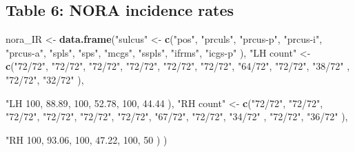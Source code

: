\documentclass[
]{article}
\newenvironment{Shaded}{\begin{snugshade}}{\end{snugshade}}
\newcommand{\DecValTok}[1]{\textcolor[rgb]{0.00,0.00,0.81}{#1}}
\newcommand{\FloatTok}[1]{\textcolor[rgb]{0.00,0.00,0.81}{#1}}
\newcommand{\KeywordTok}[1]{\textcolor[rgb]{0.13,0.29,0.53}{\textbf{#1}}}
\newcommand{\NormalTok}[1]{#1}
\newcommand{\StringTok}[1]{\textcolor[rgb]{0.31,0.60,0.02}{#1}}
\begin{document}
\hypertarget{table-6-nora-incidence-rates}{%
\subsection{Table 6: NORA incidence
rates}\label{table-6-nora-incidence-rates}}

\begin{Shaded}
\begin{Highlighting}[]
\NormalTok{nora_IR <-}\StringTok{ }\KeywordTok{data.frame}\NormalTok{(}\StringTok{"sulcus"}\NormalTok{ <-}\StringTok{ }\KeywordTok{c}\NormalTok{(}\StringTok{"pos"}\NormalTok{, }\StringTok{"prculs"}\NormalTok{, }\StringTok{"prcus-p"}\NormalTok{, }\StringTok{"prcus-i"}\NormalTok{, }\StringTok{"prcus-a"}\NormalTok{, }
                                         \StringTok{"spls"}\NormalTok{, }\StringTok{"sps"}\NormalTok{, }\StringTok{"mcgs"}\NormalTok{, }\StringTok{"sspls"}\NormalTok{, }\StringTok{"ifrms"}\NormalTok{, }\StringTok{"icgs-p"} 
\NormalTok{                                       ),}
                      \StringTok{"LH count"}\NormalTok{ <-}\StringTok{ }\KeywordTok{c}\NormalTok{(}\StringTok{"72/72"}\NormalTok{, }\StringTok{"72/72"}\NormalTok{, }\StringTok{"72/72"}\NormalTok{, }\StringTok{"72/72"}\NormalTok{, }\StringTok{"72/72"}\NormalTok{,}
                                      \StringTok{"72/72"}\NormalTok{, }\StringTok{"64/72"}\NormalTok{, }\StringTok{"72/72"}\NormalTok{, }\StringTok{"38/72"}\NormalTok{ , }\StringTok{"72/72"}\NormalTok{, }\StringTok{"32/72"}
\NormalTok{                           ),}
                           \StringTok{"LH %"}\NormalTok{ <-}\StringTok{ }\KeywordTok{c}\NormalTok{(}\DecValTok{100}\NormalTok{, }\DecValTok{100}\NormalTok{, }\DecValTok{100}\NormalTok{, }\DecValTok{100}\NormalTok{, }\DecValTok{100}\NormalTok{,}
                                       \DecValTok{100}\NormalTok{, }\FloatTok{88.89}\NormalTok{, }\DecValTok{100}\NormalTok{, }\FloatTok{52.78}\NormalTok{, }\DecValTok{100}\NormalTok{, }\FloatTok{44.44}
\NormalTok{                           ),}
                           \StringTok{"RH count"}\NormalTok{ <-}\StringTok{ }\KeywordTok{c}\NormalTok{(}\StringTok{"72/72"}\NormalTok{, }\StringTok{"72/72"}\NormalTok{, }\StringTok{"72/72"}\NormalTok{, }\StringTok{"72/72"}\NormalTok{, }\StringTok{"72/72"}\NormalTok{,}
                                      \StringTok{"72/72"}\NormalTok{, }\StringTok{"67/72"}\NormalTok{, }\StringTok{"72/72"}\NormalTok{, }\StringTok{"34/72"}\NormalTok{ , }\StringTok{"72/72"}\NormalTok{, }\StringTok{"36/72"}
\NormalTok{                      ),}
                           \StringTok{"RH %"}\NormalTok{ <-}\StringTok{ }\KeywordTok{c}\NormalTok{(}\DecValTok{100}\NormalTok{, }\DecValTok{100}\NormalTok{, }\DecValTok{100}\NormalTok{, }\DecValTok{100}\NormalTok{, }\DecValTok{100}\NormalTok{,}
                                       \DecValTok{100}\NormalTok{, }\FloatTok{93.06}\NormalTok{, }\DecValTok{100}\NormalTok{, }\FloatTok{47.22}\NormalTok{, }\DecValTok{100}\NormalTok{, }\DecValTok{50}
\NormalTok{                      )}
\NormalTok{                           )}

}}
\end{Highlighting}
\end{Shaded}
\end{document}
